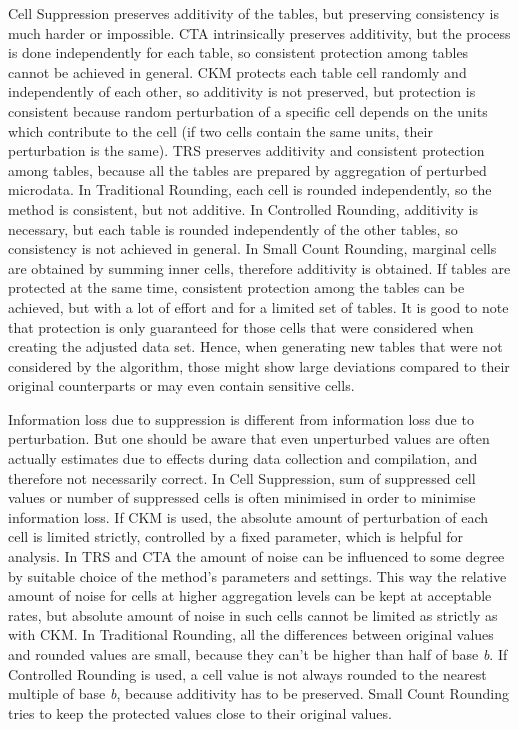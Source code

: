 Cell Suppression preserves additivity of the tables, but preserving consistency is much harder or impossible.
CTA intrinsically preserves additivity, but the process is done independently for each table, so consistent protection among tables cannot be achieved in general.
CKM protects each table cell randomly and independently of each other, so additivity is not preserved, but protection is consistent because random perturbation of a specific cell depends on the units which contribute to the cell (if two cells contain the same units, their perturbation is the same).
TRS preserves additivity and consistent protection among tables, because all the tables are prepared by aggregation of perturbed microdata. 
In Traditional Rounding, each cell is rounded independently, so the method is consistent, but not additive.
In Controlled Rounding, additivity is necessary, but each table is rounded independently of the other tables, so consistency is not achieved in general.
In Small Count Rounding, marginal cells are obtained by summing inner cells, therefore additivity is obtained. If tables are protected at the same time, consistent protection among the tables can be achieved, but with a lot of effort and for a limited set of tables.  It is good to note that protection is only guaranteed for those cells that were considered when creating the adjusted data set. Hence, when generating new tables that were not considered by the algorithm, those might show large deviations compared to their original counterparts or may even contain sensitive cells.

Information loss due to suppression is different from information loss due to perturbation. But one should be aware that even unperturbed values are often actually estimates due to effects during data collection and compilation, and therefore not necessarily correct.
In Cell Suppression, sum of suppressed cell values or number of suppressed cells is often minimised in order to minimise information loss.
If CKM is used, the absolute amount of perturbation of each cell is limited strictly, controlled by a fixed parameter, which is helpful for analysis.
In TRS and CTA the amount of noise can be influenced to some degree by suitable choice of the method's parameters and settings. This way the relative amount of noise for cells at higher aggregation levels can be kept at acceptable rates, but absolute amount of noise in such cells cannot be limited as strictly as with CKM.
In Traditional Rounding, all the differences between original values and rounded values are small, because they can't be higher than half of base \textit{b}.
If Controlled Rounding is used, a cell value is not always rounded to the nearest multiple of base \textit{b}, because additivity has to be preserved.
Small Count Rounding tries to keep the protected values close to their original values.
